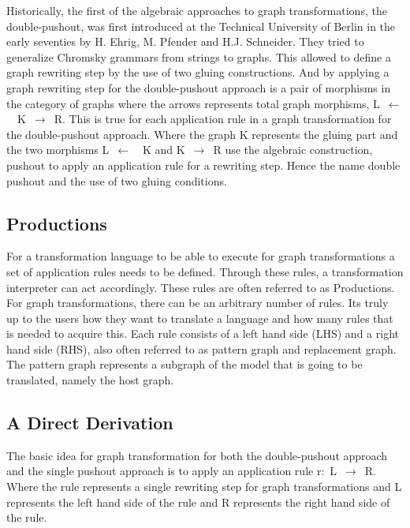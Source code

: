 \documentclass[pdftex,11pt,a4paper]{article}
\begin{document}
\indent Historically, the first of the algebraic approaches to graph
transformations, the double-pushout, was first introduced at the Technical
University of Berlin in the early seventies by H. Ehrig, M. Pfender and H.J.
Schneider\cite{INSPEC:606170}. They tried to generalize Chromsky grammars from
strings to graphs. This allowed to define a graph rewriting step by the use of
two gluing constructions. And by applying a graph rewriting step for the
double-pushout approach is a pair of morphisms in the category of graphs where
the arrows represents total graph morphisms, \linebreak\mbox{L $\longleftarrow$
\ K $\longrightarrow$ R}. This is true for each application rule in a graph
transformation for the double-pushout approach. Where the graph K represents the
gluing part and the two morphisms \mbox{L $\longleftarrow$ \ K} and \mbox{K
$\longrightarrow$ R} use the algebraic construction, pushout to apply an
application rule for a rewriting step. Hence the name double pushout and the use
of two gluing conditions.


\subsection{Productions}
\noindent For a transformation language to be able to execute for graph
transformations a set of application rules needs to be defined. Through these
rules, a transformation interpreter can act accordingly. These rules are often
referred to as Productions. For graph transformations, there can be an arbitrary
number of rules. Its truly up to the users how they want to translate a
language and how many rules that is needed to acquire this. Each rule consists
of a left hand side (LHS) and a right hand side (RHS), also often referred to as
pattern graph and replacement graph. The pattern graph represents a subgraph of
the model that is going to be translated, namely the host graph.

\subsection{A Direct Derivation}
\noindent The basic idea for graph transformation for both the double-pushout
approach and the single pushout approach is to apply an application rule
\mbox{r: L $\longrightarrow$ R}. Where the rule represents a single rewriting
step for graph transformations and L represents the left hand side of the rule and R
represents the right hand side of the rule.
\end{document}
